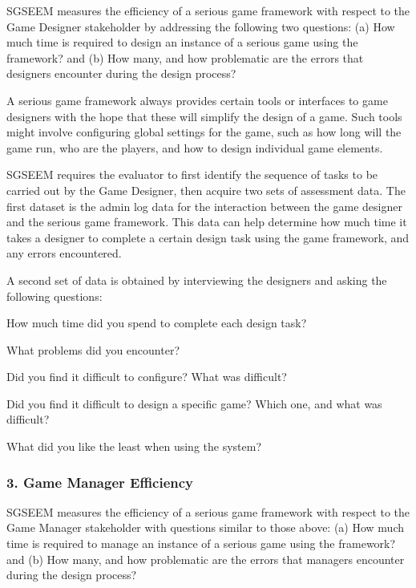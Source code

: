 \documentclass{sigchi}
\begin{document}
SGSEEM measures the efficiency of a serious game framework with respect to the Game
Designer stakeholder by addressing the following two questions: (a) How much time is
required to design an instance of a serious game using the framework? and (b) How many,
and how problematic are the errors that designers encounter during the design process?

A serious game framework always provides certain tools or interfaces to game designers
with the hope that these will simplify the design of a game. Such tools might involve
configuring global settings for the game, such as how long will the game run, who are the
players, and how to design individual game elements.

SGSEEM requires the evaluator to first identify the sequence of tasks to be carried out by
the Game Designer, then acquire two sets of assessment data.
The first dataset is the admin log data for the interaction between the game designer
and the serious game framework. This data can help determine how much 
time it takes a designer to complete a certain design task using the game
framework, and any errors encountered. 

A second set of data is obtained by interviewing the designers and asking the following questions:
\begin{compactitem}
\item How much time did you spend to complete each design task?
\item What problems did you encounter?
\item Did you find it difficult to configure? What was difficult?
\item Did you find it difficult to design a specific game? Which one, and what was difficult?
\item What did you like the least when using the system?
\end{compactitem}



\subsubsection{3. Game Manager Efficiency}


SGSEEM measures the efficiency of a serious game framework with respect to the Game
Manager stakeholder with questions similar to those above: (a) How much time is
required to manage an instance of a serious game using the framework? and (b) How many,
and how problematic are the errors that managers encounter during the design process?
\end{document}
